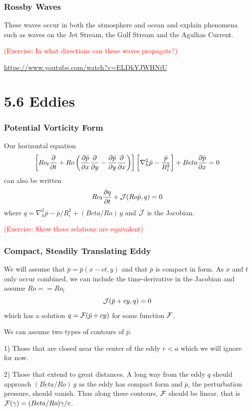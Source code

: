 \documentclass[xcolor=dvipsnames]{beamer}
\begin{document}
\begin{frame}
\frametitle{Rossby Waves}

These waves occur in both the atmosphere and ocean and explain phenomena such as waves on the Jet Stream, the Gulf Stream and the Agulhas Current.

\textcolor{red}{(Exercise: In what directions can these waves propagate?)}

\url{https://www.youtube.com/watch?v=ELDkYJWHNiU}
\end{frame}

\section{5.6 Eddies}

\begin{frame}
\frametitle{Potential Vorticity Form}

Our horizontal equation
\[
\left[ Ro_t \frac {\partial}{\partial t} + Ro \left(\frac{\partial \bar p}{\partial x} \frac {\partial}{\partial y} - \frac{\partial \bar p}{\partial y} \frac {\partial}{\partial x}\right)\right] \left[ \nabla_h^2 \bar p - \frac{\bar p}{R_i^2}\right] + Beta \frac{\partial \bar p}{\partial x} =0\]
can also be written
\[ Ro_t \frac{\partial q}{\partial t} + {\cal J}(Ro \bar{p}, q) = 0 \]
where $q = \nabla_h^2 \bar p - \bar p / R_i^2 + (Beta/Ro)\, y$ and ${\cal J}$ is the Jacobian.

\textcolor{red}{(Exercise: Show these relations are equivalent)}
\end{frame}
\begin{frame}
\frametitle{Compact, Steadily Translating Eddy}

We will assume that $\bar{p} = \bar{p}(x-ct,y)$ and that $\bar{p}$ is compact in form.  As $x$ and $t$ only occur combined, we can include the time-derivative in the Jacobian and assume $Ro == Ro_t$
\[ {\cal J}(\bar{p} + c y, q) = 0\]
which has a solution $q = {\cal F}(\bar{p} + cy)$ for some function ${\cal F}$.

We can assume two types of contours of $\bar{p}$.  

1) Those that are closed near the center of the eddy $r < a$ which we will ignore for now.
  
2) Those that extend to great distances.  A long way from the eddy $q$ should approach $(Beta/Ro)\, y$ as the eddy has compact form and $\bar p$, the perturbation pressure, should vanish.  Thus along these contours, ${\cal F}$ should be linear, that is ${\cal F}(\gamma) = (Beta/Ro) \gamma/c$. 

\end{frame}
\end{document}

